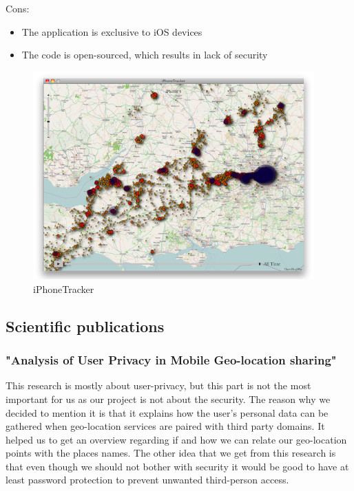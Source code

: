 \documentclass[12p]{article}
\begin{document}
Cons:
\begin{itemize}
    \item The application is exclusive to iOS devices
    \item The code is open-sourced, which results in lack of security
\end{itemize}

\begin{figure}[ht]
	    \center
        \includegraphics[height=8cm,keepaspectratio]{pics/state-of-the-art/iOS_track.png}
        \caption{iPhoneTracker}
    \end{figure}

\newpage
\subsection{Scientific publications}
\subsubsection["Analysis of User Privacy in Mobile Geo-location sharing"]{"Analysis of User Privacy in Mobile Geo-location sharing" \cite{UserPrivacyPaper}}

This research is mostly about user-privacy, but this part is not the most important for us as our project is not about the security. The reason why we decided to mention it is that it explains how the user's personal data can be gathered when geo-location services are paired with third party domains. It helped us to get an overview regarding if and how we can relate our geo-location points with the places names. The other idea that we get from this research is that even though we should not bother with security it would be good to have at least password protection to prevent unwanted third-person access.
\end{document}
